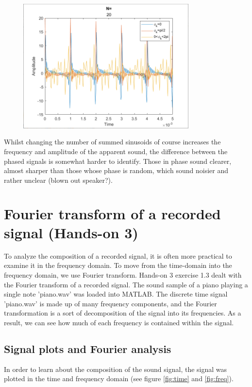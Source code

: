 \documentclass[journal]{IEEEtran}
\begin{document}
\begin{figure}[H]
    \centering
    \includegraphics[width=9cm]{assignment_01/plots/N=20.png}
    \label{fig:N=20}
\end{figure}

Whilst changing the number of summed sinusoids of course increases the frequency and amplitude of the apparent sound, the difference between the phased signals is somewhat harder to identify. Those in phase sound clearer, almost sharper than those whose phase is random, which sound noisier and rather unclear (blown out speaker?).

\section{Fourier transform of a recorded signal (Hands-on 3)}
To analyze the composition of a recorded signal, it is often more practical to examine it in the frequency domain. To move from the time-domain into the frequency domain, we use Fourier transform. 
Hands-on 3 exercise 1.3 dealt with the Fourier transform of a recorded signal. The sound sample of a piano playing a single note 'piano.wav' was loaded into MATLAB. The discrete time signal 'piano.wav' is made up of many frequency components, and the Fourier transformation is a sort of decomposition of the signal into its frequencies. As a result, we can see how much of each frequency is contained within the signal.

\subsection{Signal plots and Fourier analysis}
In order to learn about the composition of the sound signal, the signal was plotted in the time and frequency domain (see figure \ref{fig:time} and \ref{fig:freq}). 
\end{document}
